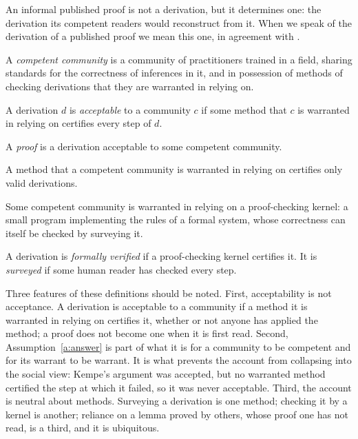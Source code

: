 \documentclass{situationist-preprint}
\begin{document}
An informal published proof is not a derivation, but it determines one: the derivation its competent readers would reconstruct from it. When we speak of the derivation of a published proof we mean this one, in agreement with \citet{Azzouni2004}.

\begin{definition}\label{d:comp}
A \emph{competent community} is a community of practitioners trained in a field, sharing standards for the correctness of inferences in it, and in possession of methods of checking derivations that they are warranted in relying on.
\end{definition}

\begin{definition}[Acceptability]\label{d:acc}
A derivation $d$ is \emph{acceptable} to a community $c$ if some method that $c$ is warranted in relying on certifies every step of $d$.
\end{definition}

\begin{definition}[Proof]\label{d:proof}
A \emph{proof} is a derivation acceptable to some competent community.
\end{definition}

\begin{assumption}[Answerability]\label{a:answer}
A method that a competent community is warranted in relying on certifies only valid derivations.
\end{assumption}

\begin{assumption}\label{a:kernel}
Some competent community is warranted in relying on a proof-checking kernel: a small program implementing the rules of a formal system, whose correctness can itself be checked by surveying it.
\end{assumption}

\begin{definition}\label{d:ver}
A derivation is \emph{formally verified} if a proof-checking kernel certifies it. It is \emph{surveyed} if some human reader has checked every step.
\end{definition}

Three features of these definitions should be noted. First, acceptability is not acceptance. A derivation is acceptable to a community if a method it is warranted in relying on certifies it, whether or not anyone has applied the method; a proof does not become one when it is first read. Second, Assumption~\ref{a:answer} is part of what it is for a community to be competent and for its warrant to be warrant. It is what prevents the account from collapsing into the social view: Kempe's argument was accepted, but no warranted method certified the step at which it failed, so it was never acceptable. Third, the account is neutral about methods. Surveying a derivation is one method; checking it by a kernel is another; reliance on a lemma proved by others, whose proof one has not read, is a third, and it is ubiquitous.
\end{document}
